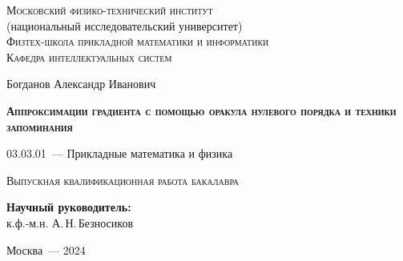\thispagestyle{empty}

\begin{titlepage}
    \begin{center}
        \textsc{Московский физико-технический институт}\\
        (национальный исследовательский университет)\\
        \textsc{Физтех-школа прикладной математики и информатики}\\
        \textsc{Кафедра интеллектуальных систем}
    \end{center}
    \vspace{2.5cm}
    \begin{center}
        {Богданов Александр Иванович}
        \par
        \vspace{2cm}
        {\Large \textsc{\textbf{Аппроксимации градиента с помощью оракула нулевого порядка и техники запоминания}}}
        \par
        \vspace{2cm}
        {03.03.01~--- Прикладные математика и физика}
        \par
        \vspace{2cm}
        \textsc{Выпускная квалификационная работа бакалавра}
    \end{center}
    \vspace{2cm}
    \hfill\parbox{8,4cm}{\textbf{Научный руководитель:}
    \\к.ф.-м.н. А.\,Н.\,Безносиков}
    \par
    \vspace{2cm}
    \begin{center}
        {Москва~--- 2024}
    \end{center}
\end{titlepage}